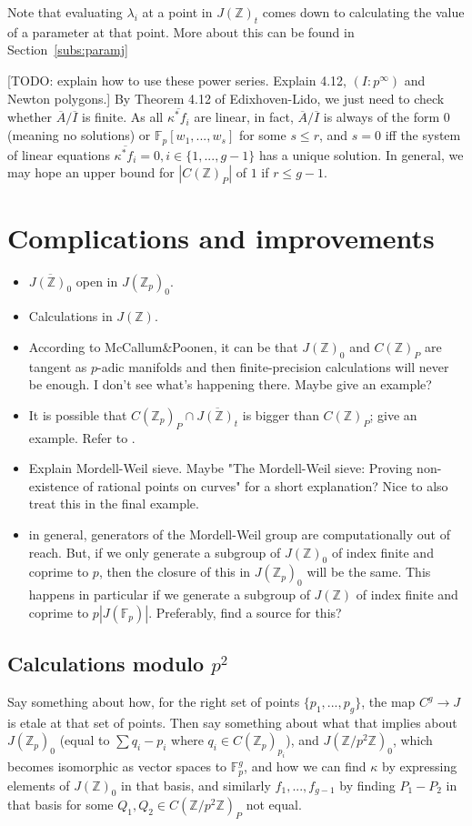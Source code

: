 \documentclass[12pt]{article}
\newcommand{\Z}{\mathbb{Z}}
\newcommand{\F}{\mathbb{F}}
\theoremstyle{plain}
\theoremstyle{definition}
\theoremstyle{remark}
\begin{document}
Note that evaluating $\lambda_i$ at a point in $J(\Z)_t$ comes down to calculating the value of a parameter at that point. More about this can be found in Section~\ref{subs:paramj}

[TODO: explain how to use these power series. Explain 4.12, $(I : p^\infty)$ and Newton polygons.]
By Theorem 4.12 of Edixhoven-Lido, we just need to check whether $\overline{A}/\overline{I}$ is finite. As all $\overline{\kappa^* f_i}$ are linear, in fact, $\overline{A}/\overline{I}$ is always of the form $0$ (meaning no solutions) or $\F_p[w_1,...,w_s]$ for some $s \leq r$, and $s = 0$ iff the system of linear equations $\overline{\kappa^* f_i} = 0, i \in \{1,...,g-1\}$ has a unique solution. In general, we may hope an upper bound for $|C(\Z)_P|$ of $1$ if $r \leq g-1$.


\section{Complications and improvements}
\begin{itemize}
\item $\overline{J(\Z)_0}$ open in $J(\Z_p)_0$.
\item Calculations in $J(\Z)$.
\item According to McCallum\&Poonen, it can be that $J(\Z)_0$ and $C(\Z)_P$ are tangent as $p$-adic manifolds and then finite-precision calculations will never be enough. I don't see what's happening there. Maybe give an example? 
\item It is possible that $C(\Z_p)_P \cap \overline{J(\Z)_t}$ is bigger than $C(\Z)_P$; give an example. Refer to \citep{Balakrishnan19}.
\item Explain Mordell-Weil sieve. Maybe "The Mordell-Weil sieve: Proving non-existence of rational points on curves" for a short explanation? Nice to also treat this in the final example.
\item in general, generators of the Mordell-Weil group are computationally out of reach. But, if we only generate a subgroup of $J(\Z)_0$ of index finite and coprime to $p$, then the closure of this in $J(\Z_p)_0$ will be the same. This happens in particular if we generate a subgroup of $J(\Z)$ of index finite and coprime to $p|J(\F_p)|$. Preferably, find a source for this?
\end{itemize}

\subsection{Calculations modulo \texorpdfstring{$p^2$}{p\^2}}
Say something about how, for the right set of points $\{p_1,...,p_g\}$, the map $C^{g} \to J$ is etale at that set of points. Then say something about what that implies about $J(\Z_p)_0$ (equal to $\sum q_i - p_i$ where $q_i \in C(\Z_p)_{p_i}$), and $J(\Z/p^2\Z)_0$, which becomes isomorphic as vector spaces to $\F_p^g$, and how we can find $\kappa$ by expressing elements of $J(\Z)_0$ in that basis, and similarly $f_1,...,f_{g-1}$ by finding $P_1 - P_2$ in that basis for some $Q_1,Q_2 \in C(\Z/p^2\Z)_P$ not equal.
\end{document}
